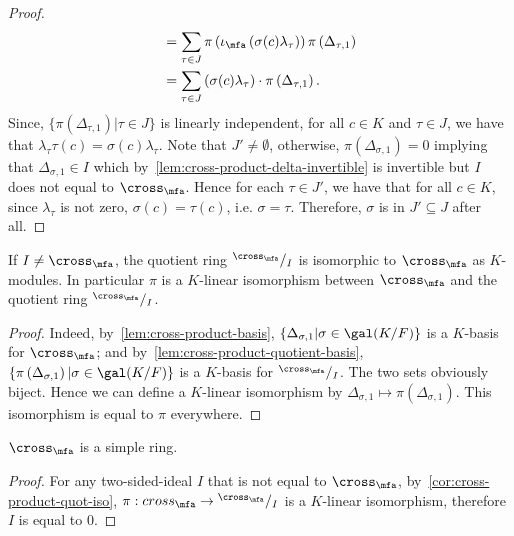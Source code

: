 \begin{proof}
\[\begin{aligned}
      &= \sum_{\tau\in J}
        \pi\left(\iota_{\mfa}\left(\sigma(c)\lambda_{\tau}\right)\right)
        \pi\left(\Delta_{\tau, 1}\right) \\
      &= \sum_{\tau\in J}
        \left(\sigma(c)\lambda_{\tau}\right)\cdot \pi\left(\Delta_{\tau, 1}\right).
    \end{aligned}
  \]
  Since, $\{\pi\left(\Delta_{\tau, 1}\right) | \tau \in J\}$ is linearly independent, for all $c \in K$ and $\tau\in J$, we have that $\lambda_{\tau}\tau(c) = \sigma(c)\lambda_{\tau}$. Note that $J' \ne \emptyset$, otherwise, $\pi\left(\Delta_{\sigma, 1}\right) = 0$ implying that $\Delta_{\sigma, 1} \in I$ which by~\cref{lem:cross-product-delta-invertible} is invertible but $I$ does not equal to $\cross_{\mfa}$. Hence for each $\tau \in J'$, we have that for all $c \in K$, since $\lambda_{\tau}$ is not zero, $\sigma(c) = \tau(c)$, i.e. $\sigma = \tau$. Therefore, $\sigma$ is in $J' \subseteq J$ after all.
\end{proof}

\begin{corollary}\label{cor:cross-product-quot-iso}
  If $I \ne \cross_{\mfa}$, the quotient ring ${}^{\cross_{\mfa}}/_{I}$ is isomorphic to $\cross_{\mfa}$ as $K$-modules. In particular $\pi$ is a $K$-linear isomorphism between $\cross_{\mfa}$ and the quotient ring ${}^{\cross_{\mfa}}/_{I}$.
  \leanok
\end{corollary}

\begin{proof}
  Indeed, by~\cref{lem:cross-product-basis}, $\{\Delta_{\sigma, 1}|\sigma \in \gal(K/F)\}$ is a $K$-basis for $\cross_{\mfa}$; and by~\cref{lem:cross-product-quotient-basis}, $\{\pi\left(\Delta_{\sigma, 1}\right) | \sigma\in\gal(K/F)\}$ is a $K$-basis for ${}^{\cross_{\mfa}}/_{I}$. The two sets obviously biject. Hence we can define a $K$-linear isomorphism by $\Delta_{\sigma, 1} \mapsto \pi\left(\Delta_{\sigma, 1}\right)$. This isomorphism is equal to $\pi$ everywhere.
\end{proof}

\begin{corollary}\label{cor:cross-product-simple}
  $\cross_{\mfa}$ is a simple ring.
  \leanok
\end{corollary}

\begin{proof}
  For any two-sided-ideal $I$ that is not equal to $\cross_{\mfa}$, by~\cref{cor:cross-product-quot-iso}, $\pi : cross_{\mfa} \to {}^{\cross_{\mfa}}/_{I}$ is a $K$-linear isomorphism, therefore $I$ is equal to $0$.
\end{proof}


